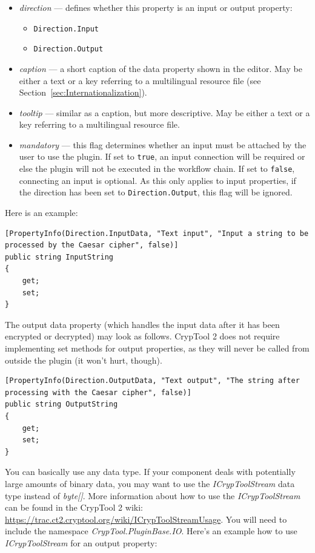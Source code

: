 \begin{itemize}
	\item \textit{direction} --- defines whether this property is an input or output property:
	\begin{itemize}
		\item \texttt{Direction.Input}
		\item \texttt{Direction.Output}
	\end{itemize}
	\item \textit{caption} --- a short caption of the data property shown in the editor. May be either a text or a key referring to a multilingual resource file (see Section~\ref{sec:Internationalization}).
	\item \textit{tooltip} --- similar as a caption, but more descriptive. May be either a text or a key referring to a multilingual resource file.
	\item \textit{mandatory} --- this flag determines whether an input must be attached by the user to use the plugin. If set to \texttt{true}, an input connection will be required or else the plugin will not be executed in the workflow chain. If set to \texttt{false}, connecting an input is optional. As this only applies to input properties, if the direction has been set to \texttt{Direction.Output}, this flag will be ignored.

\end{itemize}

Here is an example:
\clearpage

\begin{lstlisting}
[PropertyInfo(Direction.InputData, "Text input", "Input a string to be processed by the Caesar cipher", false)]
public string InputString
{
	get;
	set;
}
\end{lstlisting}

The output data property (which handles the input data after it has been encrypted or decrypted) may look as follows. CrypTool 2 does not require implementing set methods for output properties, as they will never be called from outside the plugin (it won't hurt, though).

\begin{lstlisting}
[PropertyInfo(Direction.OutputData, "Text output", "The string after processing with the Caesar cipher", false)]
public string OutputString
{
	get;
	set;
}
\end{lstlisting}

You can basically use any data type. If your component deals with potentially large amounts of binary data, you may want to use the \textit{ICrypToolStream} data type instead of \textit{byte[]}. More information about how to use the \textit{ICrypToolStream} can be found in the CrypTool 2 wiki: \url{https://trac.ct2.cryptool.org/wiki/ICrypToolStreamUsage}. You will need to include the namespace \textit{CrypTool.PluginBase.IO}. Here's an example how to use \textit{ICrypToolStream} for an output property:


